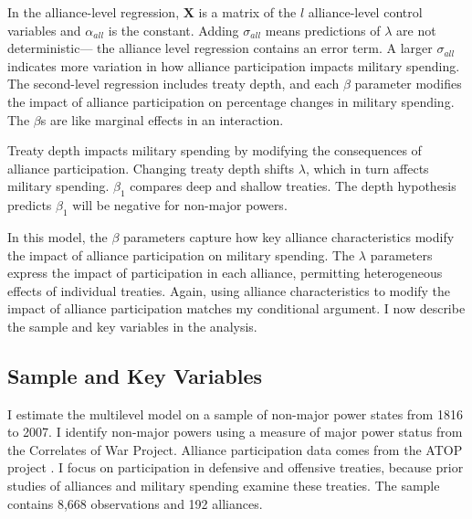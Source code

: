 \documentclass[12pt]{article}
\begin{document}
In the alliance-level regression, $\textbf{X}$ is a matrix of the $l$ alliance-level control variables and $\alpha_{all}$ is the constant.
Adding $\sigma_{all}$ means predictions of $\lambda$ are not deterministic--- the alliance level regression contains an error term. 
A larger $\sigma_{all}$ indicates more variation in how alliance participation impacts military spending. 
The second-level regression includes treaty depth, and each $\beta$ parameter modifies the impact of alliance participation on percentage changes in military spending. 
The $\beta$s are like marginal effects in an interaction. 


Treaty depth impacts military spending by modifying the consequences of alliance participation. 
Changing treaty depth shifts $\lambda$, which in turn affects military spending.
$\beta_1$ compares deep and shallow treaties. 
The depth hypothesis predicts $\beta_1$ will be negative for non-major powers. 


In this model, the $\beta$ parameters capture how key alliance characteristics modify the impact of alliance participation on military spending. 
The $\lambda$ parameters express the impact of participation in each alliance, permitting heterogeneous effects of individual treaties. 
Again, using alliance characteristics to modify the impact of alliance participation matches my conditional argument. 
I now describe the sample and key variables in the analysis.  



\subsection*{Sample and Key Variables} 

I estimate the multilevel model on a sample of non-major power states from 1816 to 2007. 
I identify non-major powers using a measure of major power status from the Correlates of War Project. 
Alliance participation data comes from the ATOP project \citep{Leedsetal2002}.  
I focus on participation in defensive and offensive treaties, because prior studies of alliances and military spending examine these treaties. 
The sample contains 8,668 observations and 192 alliances. 
\end{document}
